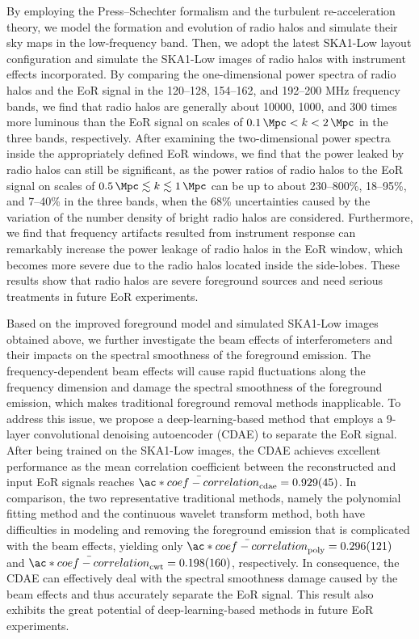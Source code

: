 \begin{englishabstract}
By employing the Press--Schechter formalism and the turbulent
re-acceleration theory, we model the formation and evolution of
radio halos and simulate their sky maps in the low-frequency band.
Then, we adopt the latest SKA1-Low layout configuration and simulate
the SKA1-Low images of radio halos with instrument effects incorporated.
By comparing the one-dimensional power spectra of radio halos and
the EoR signal in the \numrange{120}{128}, \numrange{154}{162},
and \numrange{192}{200} \si{\MHz} frequency bands, we find that
radio halos are generally about \num{10000}, 1000, and 300
times more luminous than the EoR signal on scales of
$\SI{0.1}{\per\Mpc} < k < \SI{2}{\per\Mpc}$ in the three bands,
respectively.
After examining the two-dimensional power spectra inside the
appropriately defined EoR windows, we find that the power leaked by
radio halos can still be significant, as the power ratios of radio halos
to the EoR signal on scales of
$\SI{0.5}{\per\Mpc} \lesssim k \lesssim \SI{1}{\per\Mpc}$ can be up to
about \numrange{230}{800}\%, \numrange{18}{95}\%, and \numrange{7}{40}\%
in the three bands, when the 68\% uncertainties caused by the variation
of the number density of bright radio halos are considered.
Furthermore, we find that frequency artifacts resulted from instrument
response can remarkably increase the power leakage of radio halos in
the EoR window, which becomes more severe due to the radio halos
located inside the side-lobes.
These results show that radio halos are severe foreground sources
and need serious treatments in future EoR experiments.

Based on the improved foreground model and simulated SKA1-Low images
obtained above, we further investigate the beam effects of
interferometers and their impacts on the spectral smoothness of
the foreground emission.
The frequency-dependent beam effects will cause
rapid fluctuations along the frequency dimension and damage the
spectral smoothness of the foreground emission, which makes
traditional foreground removal methods inapplicable.
To address this issue, we propose a deep-learning-based method
that employs a 9-layer convolutional denoising autoencoder (CDAE) to
separate the EoR signal.
After being trained on the SKA1-Low images, the CDAE achieves excellent
performance as the mean correlation coefficient between 
the reconstructed and input EoR signals reaches
$\bar{\ac*{coef-correlation}}_{\R{cdae}} = \num{0.929 +- 0.045}$.
In comparison, the two representative traditional methods, namely the
polynomial fitting method and the continuous wavelet transform method,
both have difficulties in modeling and removing the foreground emission
that is complicated with the beam effects, yielding only
$\bar{\ac*{coef-correlation}}_{\R{poly}} = \num{0.296 +- 0.121}$ and
$\bar{\ac*{coef-correlation}}_{\R{cwt}} = \num{0.198 +- 0.160}$,
respectively.
In consequence, the CDAE can effectively deal with the spectral
smoothness damage caused by the beam effects and thus accurately
separate the EoR signal.
This result also exhibits the great potential of deep-learning-based
methods in future EoR experiments.

\end{englishabstract}
